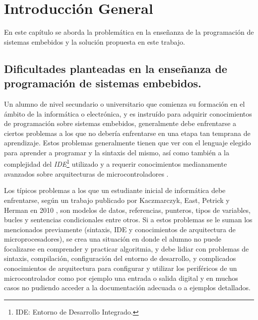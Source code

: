 
\chapter{Introducción General} %

\label{Chapter1} %
\label{IntroGeneral}


\newcommand{\keyword}[1]{\textbf{#1}}
\newcommand{\tabhead}[1]{\textbf{#1}}
\newcommand{\code}[1]{\texttt{#1}}
\newcommand{\file}[1]{\texttt{\bfseries#1}}
\newcommand{\option}[1]{\texttt{\itshape#1}}
\newcommand{\grados}{$^{\circ}$}


En este capítulo se aborda la problemática en la enseñanza de la programación de sistemas embebidos y la solución propuesta en este trabajo.

\section{Dificultades planteadas en la enseñanza de programación de sistemas embebidos.}

Un alumno de nivel secundario o universitario que comienza su formación en el ámbito de la informática o electrónica, y es instruído para adquirir conocimientos de programación sobre sistemas embebidos, generalmente debe enfrentarse a ciertos problemas a los que no debería enfrentarse en una etapa tan temprana de aprendizaje. Estos problemas generalmente tienen que ver con el lenguaje elegido para aprender a programar y la sintaxis del mismo, así como también a la complejidad del \textit{IDE}\footnote{IDE: Entorno de Desarrollo Integrado.} utilizado y a requerir conocimientos medianamente avanzados sobre arquitecturas de microcontroladores \cite{papereducacion5}. 

Los típicos problemas a los que un estudiante inicial de informática debe enfrentarse, según un trabajo publicado por Kaczmarczyk, East, Petrick y Herman en 2010 \cite{papereducacion2}, son modelos de datos, referencias, punteros, tipos de variables, bucles y sentencias condicionales entre otros. Si a estos problemas se le suman los mencionados previamente (sintaxis, IDE y conocimientos de arquitectura de microprocesadores), se crea una situación en donde el alumno no puede focalizarse en comprender y practicar algoritmia, y debe lidiar con problemas de sintaxis, compilación, configuración del entorno de desarrollo, y complicados conocimientos de arquitectura para configurar y utilizar los periféricos de un microcontrolador como por ejemplo una entrada o salida digital y en muchos casos no pudiendo acceder a la documentación adecuada o a ejemplos detallados. 

